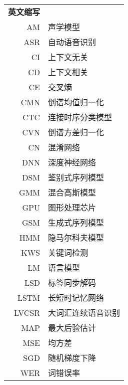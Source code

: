 \begin{longtable}{rl}
\textbf{英文缩写} \\
AM & 声学模型 \\
ASR & 自动语音识别 \\
CI & 上下文无关 \\
CD & 上下文相关 \\
CE & 交叉熵 \\
CMN & 倒谱均值归一化 \\
CTC & 连接时序分类模型 \\
CVN & 倒谱方差归一化 \\
CN & 混淆网络 \\
DNN & 深度神经网络 \\
DSM & 鉴别式序列模型 \\
GMM & 混合高斯模型 \\
GPU & 图形处理芯片 \\
GSM & 生成式序列模型 \\
HMM & 隐马尔科夫模型 \\
KWS & 关键词检测 \\
LM & 语言模型 \\
LSD & 标签同步解码 \\
LSTM & 长短时记忆网络 \\
LVCSR & 大词汇连续语音识别 \\
MAP & 最大后验估计 \\
MSE & 均方差 \\
SGD & 随机梯度下降 \\
WER & 词错误率 \\
\end{longtable}
